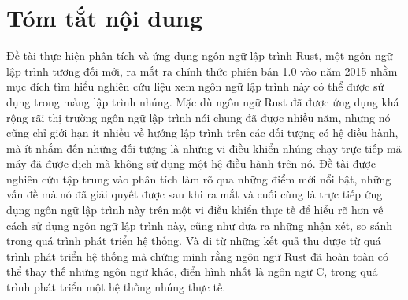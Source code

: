\chapter*{Tóm tắt nội dung}
Đề tài thực hiện phân tích và ứng dụng ngôn ngữ lập trình Rust, một ngôn ngữ lập trình tương đối mới, ra mắt ra chính thức phiên bản 1.0 vào năm 2015 nhằm mục đích tìm hiểu nghiên cứu liệu xem ngôn ngữ lập trình này có thể được sử dụng trong mảng lập trình nhúng.
Mặc dù ngôn ngữ Rust đã được ứng dụng khá rộng rãi thị trường ngôn ngữ lập trình nói chung đã được nhiều năm, nhưng nó cũng chỉ giới hạn ít nhiều về hướng lập trình trên các đối tượng có hệ điều hành, mà ít nhắm đến những đối tượng là những vi điều khiển nhúng chạy trực tiếp mã máy đã được dịch mà không sử dụng một hệ điều hành trên nó.
Đề tài được nghiên cứu tập trung vào phân tích làm rõ qua những điểm mới nổi bật, những vấn đề mà nó đã giải quyết được sau khi ra mắt và cuối cùng là trực tiếp ứng dụng ngôn ngữ lập trình này trên một vi điều khiển thực tế để hiểu rõ hơn về cách sử dụng ngôn ngữ lập trình này, cũng như đưa ra những nhận xét, so sánh trong quá trình phát triển hệ thống. Và đi từ những kết quả thu được từ quá trình phát triển hệ thống mà chứng minh rằng ngôn ngữ Rust đã hoàn toàn có thể thay thế những ngôn ngữ khác, điển hình nhất là ngôn ngữ C, trong quá trình phát triển một hệ thống nhúng thực tế.
